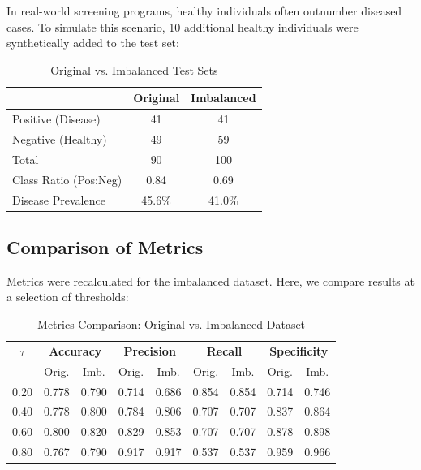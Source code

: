 \documentclass[11pt]{article}
\begin{document}
In real-world screening programs, healthy individuals often outnumber diseased cases. To simulate this scenario, 10 additional healthy individuals were synthetically added to the test set:

\begin{table}[H]
    \centering
    \caption{Original vs. Imbalanced Test Sets}
    \begin{tabular}{lcc}
        \toprule
        & \textbf{Original} & \textbf{Imbalanced} \\
        \midrule
        Positive (Disease) & 41 & 41 \\
        Negative (Healthy) & 49 & 59 \\
        Total & 90 & 100 \\
        Class Ratio (Pos:Neg) & 0.84 & 0.69 \\
        Disease Prevalence & 45.6\% & 41.0\% \\
        \bottomrule
    \end{tabular}
    \label{tab:class_balance}
\end{table}

\subsection{Comparison of Metrics}

Metrics were recalculated for the imbalanced dataset. Here, we compare results at a selection of thresholds:

\begin{table}[H]
    \centering
    \caption{Metrics Comparison: Original vs. Imbalanced Dataset}
    \small
    \begin{tabular}{c|cc|cc|cc|cc}
        \toprule
        $\tau$ & \multicolumn{2}{c|}{\textbf{Accuracy}} & \multicolumn{2}{c|}{\textbf{Precision}} & \multicolumn{2}{c|}{\textbf{Recall}} & \multicolumn{2}{c}{\textbf{Specificity}} \\
        & Orig. & Imb. & Orig. & Imb. & Orig. & Imb. & Orig. & Imb. \\
        \midrule
        0.20 & 0.778 & 0.790 & 0.714 & 0.686 & 0.854 & 0.854 & 0.714 & 0.746 \\
        0.40 & 0.778 & 0.800 & 0.784 & 0.806 & 0.707 & 0.707 & 0.837 & 0.864 \\
        0.60 & 0.800 & 0.820 & 0.829 & 0.853 & 0.707 & 0.707 & 0.878 & 0.898 \\
        0.80 & 0.767 & 0.790 & 0.917 & 0.917 & 0.537 & 0.537 & 0.959 & 0.966 \\
        \bottomrule
    \end{tabular}
    \label{tab:imbalance_comparison}
\end{table}
\end{document}
